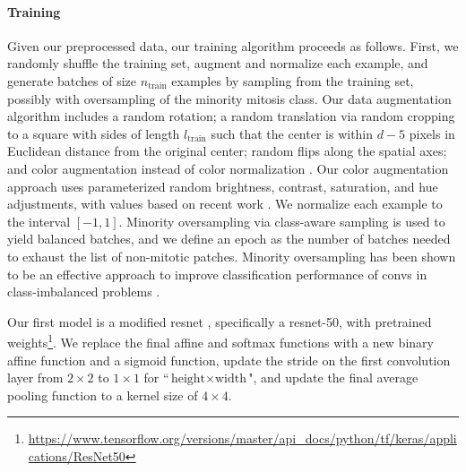 \paragraph{Training}
Given our preprocessed data, our training algorithm proceeds as follows.  First, we randomly shuffle the training set, augment and normalize each example, and generate batches of size $n_\text{train}$ examples by sampling from the training set, possibly with oversampling of the minority mitosis class.  Our data augmentation algorithm includes a random rotation; a random translation via random cropping to a square with sides of length $l_\text{train}$ such that the center is within $d-5$ pixels in Euclidean distance from the original center; random flips along the spatial axes; and color augmentation instead of color normalization \cite{Macenko:2009hf}.  Our color augmentation approach uses parameterized random brightness, contrast, saturation, and hue adjustments, with values based on recent work \cite{Liu:2017uu}.  We normalize each example to the interval $[-1,1]$.  Minority oversampling via class-aware sampling \cite{Shen:2016uo} is used to yield balanced batches, and we define an epoch as the number of batches needed to exhaust the list of non-mitotic patches.  Minority oversampling has been shown to be an effective approach to improve classification performance of \glspl{conv} in class-imbalanced problems \cite{Buda:2017tg}.

Our first model is a modified \gls{resnet} \cite{He:2015tt}, specifically a \gls{resnet}-50, with pretrained weights\footnote{\url{https://www.tensorflow.org/versions/master/api_docs/python/tf/keras/applications/ResNet50}}.  We replace the final affine and softmax functions with a new binary affine function and a sigmoid function, update the stride on the first convolution layer from $2 \times 2$ to $1 \times 1$ for ``$\text{height} \times \text{width}$", and update the final average pooling function to a kernel size of $4 \times 4$.

